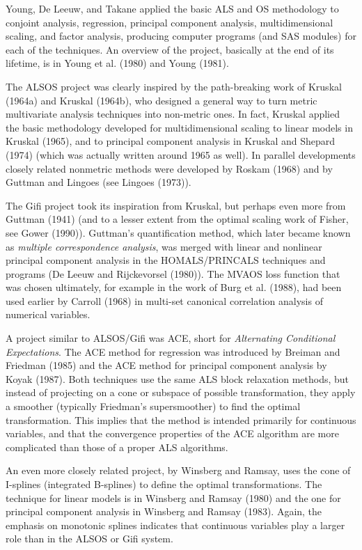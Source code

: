 \documentclass[
  12pt,
  letterpaper,
  DIV=11,
  numbers=noendperiod]{scrreprt}
\begin{document}
Young, De Leeuw, and Takane applied the basic ALS and OS methodology to
conjoint analysis, regression, principal component analysis,
multidimensional scaling, and factor analysis, producing computer
programs (and SAS modules) for each of the techniques. An overview of
the project, basically at the end of its lifetime, is in Young et al.
(1980) and Young (1981).

The ALSOS project was clearly inspired by the path-breaking work of
Kruskal (1964a) and Kruskal (1964b), who designed a general way to turn
metric multivariate analysis techniques into non-metric ones. In fact,
Kruskal applied the basic methodology developed for multidimensional
scaling to linear models in Kruskal (1965), and to principal component
analysis in Kruskal and Shepard (1974) (which was actually written
around 1965 as well). In parallel developments closely related nonmetric
methods were developed by Roskam (1968) and by Guttman and Lingoes (see
Lingoes (1973)).

The Gifi project took its inspiration from Kruskal, but perhaps even
more from Guttman (1941) (and to a lesser extent from the optimal
scaling work of Fisher, see Gower (1990)). Guttman's quantification
method, which later became known as \emph{multiple correspondence
analysis}, was merged with linear and nonlinear principal component
analysis in the HOMALS/PRINCALS techniques and programs (De Leeuw and
Rijckevorsel (1980)). The MVAOS loss function that was chosen
ultimately, for example in the work of Burg et al. (1988), had been used
earlier by Carroll (1968) in multi-set canonical correlation analysis of
numerical variables.

A project similar to ALSOS/Gifi was ACE, short for \emph{Alternating
Conditional Expectations}. The ACE method for regression was introduced
by Breiman and Friedman (1985) and the ACE method for principal
component analysis by Koyak (1987). Both techniques use the same ALS
block relaxation methods, but instead of projecting on a cone or
subspace of possible transformation, they apply a smoother (typically
Friedman's supersmoother) to find the optimal transformation. This
implies that the method is intended primarily for continuous variables,
and that the convergence properties of the ACE algorithm are more
complicated than those of a proper ALS algorithms.

An even more closely related project, by Winsberg and Ramsay, uses the
cone of I-splines (integrated B-splines) to define the optimal
transformations. The technique for linear models is in Winsberg and
Ramsay (1980) and the one for principal component analysis in Winsberg
and Ramsay (1983). Again, the emphasis on monotonic splines indicates
that continuous variables play a larger role than in the ALSOS or Gifi
system.
\end{document}
